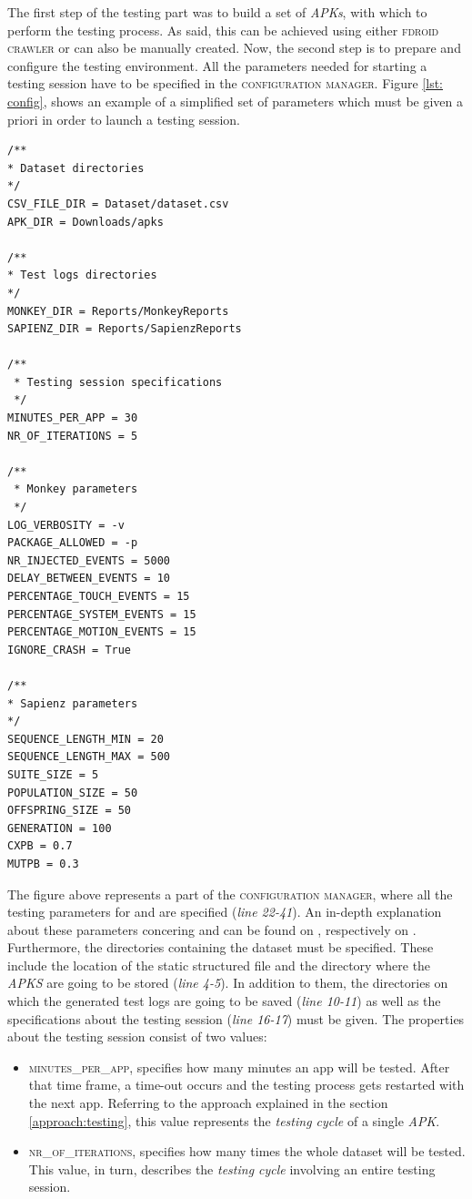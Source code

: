 The first step of the testing part was to build a set of \textit{APKs}, with which to perform the testing process. As said, this can be achieved using either \textsc{fdroid crawler} or can also be manually created. Now, the second step is to prepare and configure the testing environment. 
All the parameters needed for starting a testing session have to be specified in the \textsc{configuration manager}. Figure \ref{lst: config}, shows an example of a simplified set of parameters which must be given a priori in order to launch a testing session. \newpage
\label{lst: config}
\begin{lstlisting}[caption=Properties which get elaborated during the testing sessions,label={lst: config}]
/**
* Dataset directories
*/
CSV_FILE_DIR = Dataset/dataset.csv
APK_DIR = Downloads/apks 

/**
* Test logs directories
*/
MONKEY_DIR = Reports/MonkeyReports
SAPIENZ_DIR = Reports/SapienzReports

/**
 * Testing session specifications
 */
MINUTES_PER_APP = 30
NR_OF_ITERATIONS = 5

/**
 * Monkey parameters
 */
LOG_VERBOSITY = -v 
PACKAGE_ALLOWED = -p
NR_INJECTED_EVENTS = 5000
DELAY_BETWEEN_EVENTS = 10
PERCENTAGE_TOUCH_EVENTS = 15
PERCENTAGE_SYSTEM_EVENTS = 15
PERCENTAGE_MOTION_EVENTS = 15
IGNORE_CRASH = True

/**
* Sapienz parameters
*/
SEQUENCE_LENGTH_MIN = 20
SEQUENCE_LENGTH_MAX = 500
SUITE_SIZE = 5
POPULATION_SIZE = 50
OFFSPRING_SIZE = 50
GENERATION = 100
CXPB = 0.7
MUTPB = 0.3
\end{lstlisting}
The figure above represents a part of the \textsc{configuration manager}, where all the testing parameters for \monkey and \sapienz are specified (\textit{line 22-41}). An in-depth explanation about these parameters concering \monkey and \sapienz can be found on \cite{monkey}, respectively on \cite{sapienz}.\\
Furthermore, the directories containing the dataset must be specified. These include the location of the static structured file and the directory where the \textit{APKS} are going to be stored (\textit{line 4-5}).
In addition to them, the directories on which the generated test logs are going to be saved (\textit{line 10-11}) as well as the specifications about the testing session (\textit{line 16-17}) must be given. 
The properties about the testing session consist of two values: 
\begin{itemize}
\item \textsc{minutes\_per\_app}, specifies how many minutes an app will be tested. After that time frame, a time-out occurs and the testing process gets restarted with the next app. 
Referring to the approach explained in the section \ref{approach:testing}, this value represents the  \textit{testing cycle} of a single \textit{APK}.
\item \textsc{nr\_of\_iterations}, specifies how many times the whole dataset will be tested.
This value, in turn, describes the \textit{testing cycle} involving an entire testing session.
\end{itemize}

